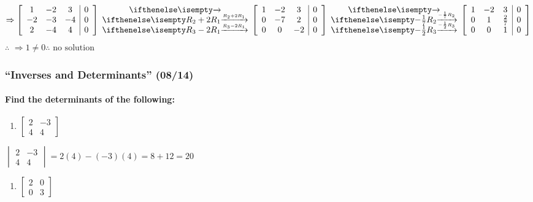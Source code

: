 \documentclass[
  letterpaper,
  DIV=11,
  numbers=noendperiod]{scrartcl}
\let\oldparagraph\paragraph
\renewcommand{\paragraph}[1]{\oldparagraph{#1}\mbox{}}
\providecommand{\tightlist}{%
  \setlength{\itemsep}{0pt}\setlength{\parskip}{0pt}}\usepackage{longtable,booktabs,array}
\begin{document}
\begin{equation*}
\begin{aligned}
\Rightarrow \left[\begin{array}{ccc|c}1 & -2 & 3 & 0 \\ -2 & -3 & -4 & 0 \\ 2 & -4 & 4 & 0\end{array}\right] \rowops{,R_2+2R_1,R_3-2R_1}\left[\begin{array}{ccc|c}1 & -2 & 3 & 0 \\ 0 & -7 & 2 & 0 \\ 0 & 0 & -2 & 0\end{array}\right] \rowops{,-\frac{1}{7}R_2,-\frac{1}{2}R_3}\left[\begin{array}{ccc|c}1 & -2 & 3 & 0 \\ 0 & 1 & \frac{2}{7} & 0 \\ 0 & 0 & 1 & 0\end{array}\right]
\end{aligned}
\end{equation*} \(\therefore\)
\(\Rightarrow 1 \ne 0 \therefore \text{ no solution}\)

\newpage{}

\subsubsection{``Inverses and Determinants''
(08/14)}\label{inverses-and-determinants-0814}

\paragraph{Find the determinants of the
following:}\label{find-the-determinants-of-the-following}

\begin{enumerate}
\def\labelenumi{\arabic{enumi})}
\tightlist
\item
  \(\begin{bmatrix}2 & -3 \\ 4 & 4 \end{bmatrix}\)
\end{enumerate}

\(\begin{vmatrix}2 & -3 \\ 4 & 4 \end{vmatrix} = 2(4)-(-3)(4) = 8+12 = 20\)

\begin{enumerate}
\def\labelenumi{\arabic{enumi})}
\setcounter{enumi}{1}
\tightlist
\item
  \(\begin{bmatrix}2 & 0 \\ 0 & 3 \end{bmatrix}\)
\end{enumerate}
\end{document}
